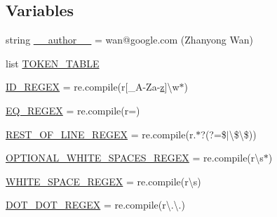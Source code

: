 \subsection*{Variables}
\begin{DoxyCompactItemize}
\item 
string \mbox{\hyperlink{namespacegoogletest-master_1_1googletest_1_1scripts_1_1pump_add9eaede5cb65627b6d69a2d107fb850}{\+\_\+\+\_\+author\+\_\+\+\_\+}} = \textquotesingle{}wan@google.\+com (Zhanyong Wan)\textquotesingle{}
\item 
list \mbox{\hyperlink{namespacegoogletest-master_1_1googletest_1_1scripts_1_1pump_a67ec39089f7871df1b8d36de71d004fb}{T\+O\+K\+E\+N\+\_\+\+T\+A\+B\+LE}}
\item 
\mbox{\hyperlink{namespacegoogletest-master_1_1googletest_1_1scripts_1_1pump_a383699e95c9717445e08b3b86de989f1}{I\+D\+\_\+\+R\+E\+G\+EX}} = re.\+compile(r\textquotesingle{}\mbox{[}\+\_\+A-\/Za-\/\mbox{\hyperlink{_obj__test_2lib_2googletest-master_2googlemock_2test_2gmock-matchers__test_8cc_a196ff6a287f53f758b1506f21269fc77}{z}}\mbox{]}\textbackslash{}w$\ast$\textquotesingle{})
\item 
\mbox{\hyperlink{namespacegoogletest-master_1_1googletest_1_1scripts_1_1pump_a81c946d3356de525e74c8755fed4cd71}{E\+Q\+\_\+\+R\+E\+G\+EX}} = re.\+compile(r\textquotesingle{}=\textquotesingle{})
\item 
\mbox{\hyperlink{namespacegoogletest-master_1_1googletest_1_1scripts_1_1pump_a56111659f999efdf4903cf17f20ec2c3}{R\+E\+S\+T\+\_\+\+O\+F\+\_\+\+L\+I\+N\+E\+\_\+\+R\+E\+G\+EX}} = re.\+compile(r\textquotesingle{}.$\ast$?(?=\$$\vert$\textbackslash{}\$\textbackslash{}\$)\textquotesingle{})
\item 
\mbox{\hyperlink{namespacegoogletest-master_1_1googletest_1_1scripts_1_1pump_a781e93797bcd221c6268757ae353ae79}{O\+P\+T\+I\+O\+N\+A\+L\+\_\+\+W\+H\+I\+T\+E\+\_\+\+S\+P\+A\+C\+E\+S\+\_\+\+R\+E\+G\+EX}} = re.\+compile(r\textquotesingle{}\textbackslash{}s$\ast$\textquotesingle{})
\item 
\mbox{\hyperlink{namespacegoogletest-master_1_1googletest_1_1scripts_1_1pump_ac8a455666ce72b77a67ee310f30263ab}{W\+H\+I\+T\+E\+\_\+\+S\+P\+A\+C\+E\+\_\+\+R\+E\+G\+EX}} = re.\+compile(r\textquotesingle{}\textbackslash{}s\textquotesingle{})
\item 
\mbox{\hyperlink{namespacegoogletest-master_1_1googletest_1_1scripts_1_1pump_ad09a9946b534a749badb085db9db7126}{D\+O\+T\+\_\+\+D\+O\+T\+\_\+\+R\+E\+G\+EX}} = re.\+compile(r\textquotesingle{}\textbackslash{}.\textbackslash{}.\textquotesingle{})
\end{DoxyCompactItemize}


